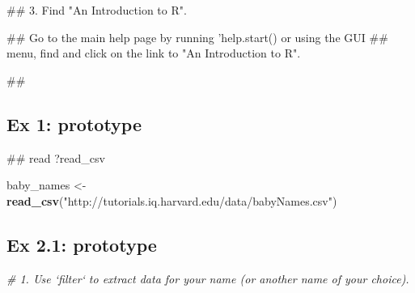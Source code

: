 \documentclass[]{book}
\newenvironment{Shaded}{\begin{snugshade}}{\end{snugshade}}
\newcommand{\KeywordTok}[1]{\textcolor[rgb]{0.13,0.29,0.53}{\textbf{#1}}}
\newcommand{\StringTok}[1]{\textcolor[rgb]{0.31,0.60,0.02}{#1}}
\newcommand{\CommentTok}[1]{\textcolor[rgb]{0.56,0.35,0.01}{\textit{#1}}}
\newcommand{\NormalTok}[1]{#1}
\begin{document}
\begin{Shaded}
\begin{Highlighting}[]
\NormalTok{## 3. Find "An Introduction to R".}
\end{Highlighting}
\end{Shaded}

\begin{Shaded}
\begin{Highlighting}[]
\NormalTok{## Go to the main help page by running 'help.start() or using the GUI}
\NormalTok{## menu, find and click on the link to "An Introduction to R".}
\end{Highlighting}
\end{Shaded}

\begin{Shaded}
\begin{Highlighting}[]
\NormalTok{##}
\end{Highlighting}
\end{Shaded}

\subsection{Ex 1: prototype}\label{ex-1-prototype}

\begin{Shaded}
\begin{Highlighting}[]
\NormalTok{## read ?read_csv}
\end{Highlighting}
\end{Shaded}

\begin{Shaded}
\begin{Highlighting}[]
\NormalTok{baby_names <-}\StringTok{ }\KeywordTok{read_csv}\NormalTok{(}\StringTok{"http://tutorials.iq.harvard.edu/data/babyNames.csv"}\NormalTok{)}
\end{Highlighting}
\end{Shaded}

\subsection{Ex 2.1: prototype}\label{ex-2.1-prototype}

\begin{Shaded}
\begin{Highlighting}[]
\CommentTok{# 1.  Use `filter` to extract data for your name (or another name of your choice).  }
\end{Highlighting}
\end{Shaded}
\end{document}
